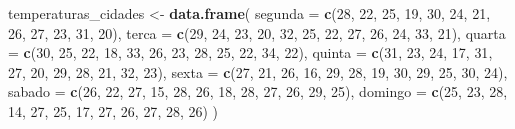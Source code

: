 \documentclass[
  portuguese,
  11pt,
  openany]{book}
\newenvironment{Shaded}{\begin{snugshade}}{\end{snugshade}}
\newcommand{\AttributeTok}[1]{\textcolor[rgb]{0.13,0.29,0.53}{#1}}
\newcommand{\DecValTok}[1]{\textcolor[rgb]{0.00,0.00,0.81}{#1}}
\newcommand{\FunctionTok}[1]{\textcolor[rgb]{0.13,0.29,0.53}{\textbf{#1}}}
\newcommand{\NormalTok}[1]{#1}
\newcommand{\OtherTok}[1]{\textcolor[rgb]{0.56,0.35,0.01}{#1}}
\begin{document}
\begin{Shaded}
\begin{Highlighting}[]
\NormalTok{temperaturas\_cidades }\OtherTok{\textless{}{-}} \FunctionTok{data.frame}\NormalTok{(}
  \AttributeTok{segunda  =} \FunctionTok{c}\NormalTok{(}\DecValTok{28}\NormalTok{, }\DecValTok{22}\NormalTok{, }\DecValTok{25}\NormalTok{, }\DecValTok{19}\NormalTok{, }\DecValTok{30}\NormalTok{, }\DecValTok{24}\NormalTok{, }\DecValTok{21}\NormalTok{, }\DecValTok{26}\NormalTok{, }\DecValTok{27}\NormalTok{, }\DecValTok{23}\NormalTok{, }\DecValTok{31}\NormalTok{, }\DecValTok{20}\NormalTok{),}
  \AttributeTok{terca    =} \FunctionTok{c}\NormalTok{(}\DecValTok{29}\NormalTok{, }\DecValTok{24}\NormalTok{, }\DecValTok{23}\NormalTok{, }\DecValTok{20}\NormalTok{, }\DecValTok{32}\NormalTok{, }\DecValTok{25}\NormalTok{, }\DecValTok{22}\NormalTok{, }\DecValTok{27}\NormalTok{, }\DecValTok{26}\NormalTok{, }\DecValTok{24}\NormalTok{, }\DecValTok{33}\NormalTok{, }\DecValTok{21}\NormalTok{),}
  \AttributeTok{quarta   =} \FunctionTok{c}\NormalTok{(}\DecValTok{30}\NormalTok{, }\DecValTok{25}\NormalTok{, }\DecValTok{22}\NormalTok{, }\DecValTok{18}\NormalTok{, }\DecValTok{33}\NormalTok{, }\DecValTok{26}\NormalTok{, }\DecValTok{23}\NormalTok{, }\DecValTok{28}\NormalTok{, }\DecValTok{25}\NormalTok{, }\DecValTok{22}\NormalTok{, }\DecValTok{34}\NormalTok{, }\DecValTok{22}\NormalTok{),}
  \AttributeTok{quinta   =} \FunctionTok{c}\NormalTok{(}\DecValTok{31}\NormalTok{, }\DecValTok{23}\NormalTok{, }\DecValTok{24}\NormalTok{, }\DecValTok{17}\NormalTok{, }\DecValTok{31}\NormalTok{, }\DecValTok{27}\NormalTok{, }\DecValTok{20}\NormalTok{, }\DecValTok{29}\NormalTok{, }\DecValTok{28}\NormalTok{, }\DecValTok{21}\NormalTok{, }\DecValTok{32}\NormalTok{, }\DecValTok{23}\NormalTok{),}
  \AttributeTok{sexta    =} \FunctionTok{c}\NormalTok{(}\DecValTok{27}\NormalTok{, }\DecValTok{21}\NormalTok{, }\DecValTok{26}\NormalTok{, }\DecValTok{16}\NormalTok{, }\DecValTok{29}\NormalTok{, }\DecValTok{28}\NormalTok{, }\DecValTok{19}\NormalTok{, }\DecValTok{30}\NormalTok{, }\DecValTok{29}\NormalTok{, }\DecValTok{25}\NormalTok{, }\DecValTok{30}\NormalTok{, }\DecValTok{24}\NormalTok{),}
  \AttributeTok{sabado   =} \FunctionTok{c}\NormalTok{(}\DecValTok{26}\NormalTok{, }\DecValTok{22}\NormalTok{, }\DecValTok{27}\NormalTok{, }\DecValTok{15}\NormalTok{, }\DecValTok{28}\NormalTok{, }\DecValTok{26}\NormalTok{, }\DecValTok{18}\NormalTok{, }\DecValTok{28}\NormalTok{, }\DecValTok{27}\NormalTok{, }\DecValTok{26}\NormalTok{, }\DecValTok{29}\NormalTok{, }\DecValTok{25}\NormalTok{),}
  \AttributeTok{domingo  =} \FunctionTok{c}\NormalTok{(}\DecValTok{25}\NormalTok{, }\DecValTok{23}\NormalTok{, }\DecValTok{28}\NormalTok{, }\DecValTok{14}\NormalTok{, }\DecValTok{27}\NormalTok{, }\DecValTok{25}\NormalTok{, }\DecValTok{17}\NormalTok{, }\DecValTok{27}\NormalTok{, }\DecValTok{26}\NormalTok{, }\DecValTok{27}\NormalTok{, }\DecValTok{28}\NormalTok{, }\DecValTok{26}\NormalTok{)}
\NormalTok{)}
\end{Highlighting}
\end{Shaded}
\end{document}
